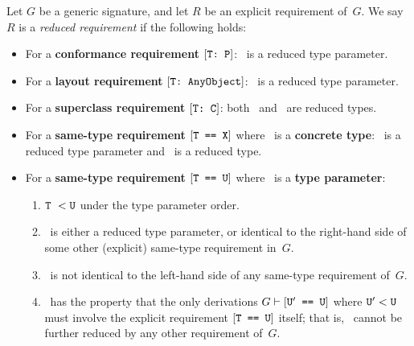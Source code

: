 \documentclass[../generics]{subfiles}
\begin{document}
\begin{definition}\label{reduced requirement}
Let $G$ be a generic signature, and let $R$ be an explicit requirement of~$G$. We say $R$ is a \emph{reduced requirement} if the following holds:
\begin{itemize}
\item For a \textbf{conformance requirement} $[\texttt{T:~P}]$: \tT\ is a reduced type parameter.
\item For a \textbf{layout requirement} $[\texttt{T:~AnyObject}]$: \tT\ is a reduced type parameter.
\item For a \textbf{superclass requirement} $[\texttt{T:~C}]$: both \tT\ and \tC\ are reduced types.
\item For a \textbf{same-type requirement} $[\texttt{T == X}]$ where \tX\ is a \textbf{concrete type}: \tT\ is a reduced type parameter and \tX\ is a reduced type.
\item For a \textbf{same-type requirement} $[\texttt{T == U}]$ where \tU\ is a \textbf{type parameter}:
\begin{enumerate}
\item $\texttt{T}\ < \texttt{U}$ under the type parameter order.
\item \tT\ is either a reduced type parameter, or identical to the right-hand side of some other (explicit) same-type requirement in~$G$.
\item \tT\ is not identical to the left-hand side of any same-type requirement of~$G$.
\item \tU\ has the property that the only derivations $G\vdash[\texttt{$\texttt{U}'$ == U}]$ where $\texttt{U}'<\texttt{U}$ must involve the explicit requirement $[\texttt{T == U}]$ itself; that is, \tU\ cannot be further reduced by any other requirement of~$G$.
\end{enumerate}
\end{itemize}
\end{definition}
\end{document}

